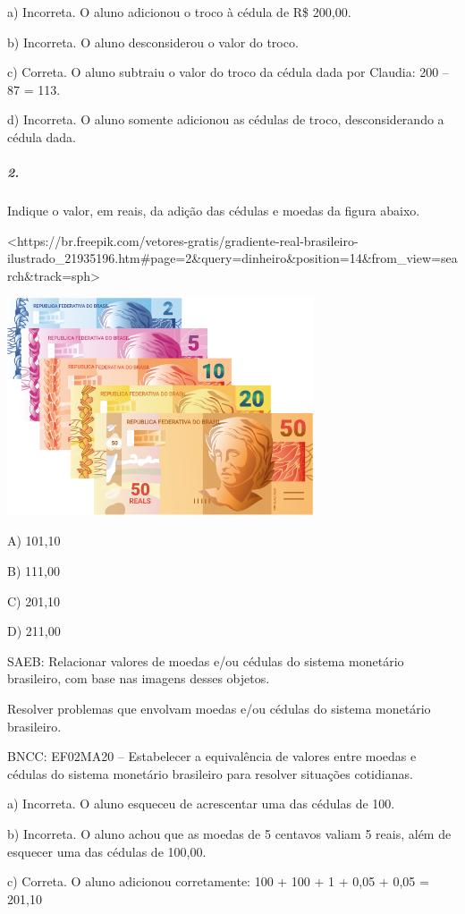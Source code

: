 a) Incorreta. O aluno adicionou o troco à cédula de R\$ 200,00.

b) Incorreta. O aluno desconsiderou o valor do troco.

c) Correta. O aluno subtraiu o valor do troco da cédula dada por
Claudia: 200 -- 87 = 113.

d) Incorreta. O aluno somente adicionou as cédulas de troco,
desconsiderando a cédula dada.

\subparagraph{2. }\label{section-66}

Indique o valor, em reais, da adição das cédulas e moedas da figura
abaixo.

\textless{}https://br.freepik.com/vetores-gratis/gradiente-real-brasileiro-ilustrado\_21935196.htm\#page=2\&query=dinheiro\&position=14\&from\_view=search\&track=sph\textgreater{}

\includegraphics[width=3.56250in,height=2.54570in]{media/image78.png}

A) 101,10

B) 111,00

C) 201,10

D) 211,00

SAEB: Relacionar valores de moedas e/ou cédulas do sistema
monetário brasileiro, com base nas imagens desses objetos.

Resolver problemas que envolvam moedas e/ou cédulas do sistema monetário brasileiro.

BNCC: EF02MA20 -- Estabelecer a equivalência de valores entre moedas e
cédulas do sistema monetário brasileiro para resolver situações cotidianas.

a) Incorreta. O aluno esqueceu de acrescentar uma das cédulas de 100.

b) Incorreta. O aluno achou que as moedas de 5 centavos valiam 5 reais,
além de esquecer uma das cédulas de 100,00.

c) Correta. O aluno adicionou corretamente: 100 + 100 + 1 + 0,05 + 0,05
= 201,10

